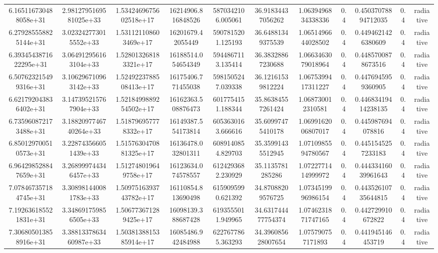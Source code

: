 \begin{table}
\begin{tabular}{ccccccccccc}
6.165116730488058e+31 & 2.9812795169581025e+33 & 1.5342469675602518e+17 & 16214906.816848526 & 5870342106.005061 & 36.91834437056262 & 1.0639496834338336 & 0.4 & 0.45037078894712035 & 0.4 & radiative \\
6.279285558825144e+31 & 3.023242773015552e+33 & 1.531121108603469e+17 & 16201679.42055449 & 5907815201.125193 & 36.64881349375539 & 1.0651496644028502 & 0.4 & 0.4494621426380609 & 0.4 & radiative \\
6.3934543871622295e+31 & 3.064912956163104e+33 & 1.528013268183321e+17 & 16188514.054654349 & 5944867113.135414 & 36.38328867230688 & 1.0663463079018964 & 0.4 & 0.4485700878673516 & 0.4 & radiative \\
6.507623215499316e+31 & 3.106296710963142e+33 & 1.5249223788508413e+17 & 16175406.771455038 & 5981505247.039338 & 36.12161539812224 & 1.0675399417311227 & 0.4 & 0.4476945959360905 & 0.4 & radiative \\
6.621792043836402e+31 & 3.147395215767904e+33 & 1.5218499889254502e+17 & 16162363.508876473 & 6017754151.188344 & 35.86384557261424 & 1.068730012310581 & 0.4 & 0.44683419414238135 & 0.4 & radiative \\
6.735960872173488e+31 & 3.1882097746740264e+33 & 1.518796957778332e+17 & 16149387.554173814 & 6053630163.666616 & 35.60997475410178 & 1.0699162006807017 & 0.4 & 0.445987694078816 & 0.4 & radiative \\
6.850129700510573e+31 & 3.228743566051439e+33 & 1.5157630470881325e+17 & 16136478.032801311 & 6089140854.829703 & 35.35991435512945 & 1.0710985594780567 & 0.4 & 0.4451545257233183 & 0.4 & radiative \\
6.964298528847659e+31 & 3.268999744346457e+33 & 1.512748019649758e+17 & 16123634.074578557 & 6124293682.230929 & 35.1135781285286 & 1.0722771414999972 & 0.4 & 0.44433416039961643 & 0.4 & radiative \\
7.078467357184745e+31 & 3.308981440081783e+33 & 1.5097516393743782e+17 & 16110854.813690498 & 6159095990.621392 & 34.87088209576725 & 1.0734519996986154 & 0.4 & 0.44352610735644815 & 0.4 & radiative \\
7.192636185521831e+31 & 3.348691759856505e+33 & 1.506773671289425e+17 & 16098139.388687428 & 6193555011.949965 & 34.631744477754374 & 1.0746231871747165 & 0.4 & 0.442729910672822 & 0.4 & radiative \\
7.306805013858916e+31 & 3.3881337863460987e+33 & 1.5038138815385914e+17 & 16085486.942484988 & 6227677865.363293 & 34.396085628007654 & 1.075790757171893 & 0.4 & 0.441945146453719 & 0.4 & radiative \\

\end{tabular}
\end{table}
